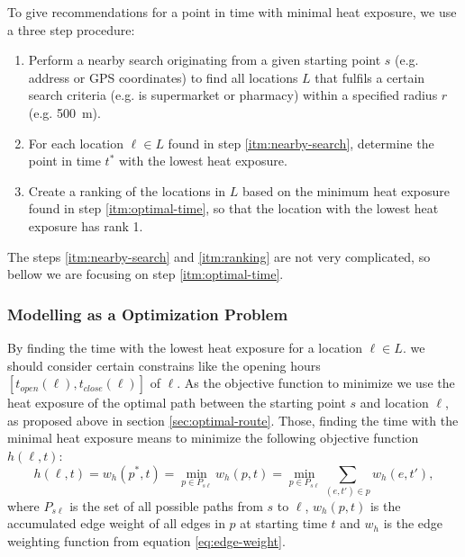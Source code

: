  To give recommendations for a point in time with minimal heat exposure, we use a three step procedure: 
 
 \begin{enumerate}
 	\item \label{itm:nearby-search} Perform a nearby search originating from a given starting point $s$  (e.g. address or GPS coordinates) to find all locations $L$ that fulfils a certain search criteria (e.g. is supermarket or pharmacy)  within a specified radius $r$ (e.g. \SI{500}{\meter}).
 	
 	\item \label{itm:optimal-time} For each location $\ell \in L$ found in step \ref{itm:nearby-search}, determine the point in time $t^*$ with the lowest heat exposure. 
 	
 	\item \label{itm:ranking} Create a ranking of the locations in $L$ based on the minimum heat exposure found in step \ref{itm:optimal-time}, so that the location with the lowest heat exposure has rank 1.
 \end{enumerate} 

The steps \ref{itm:nearby-search} and \ref{itm:ranking} are not very complicated, so bellow we are focusing on step \ref{itm:optimal-time}. 

\subsubsection{Modelling as a Optimization Problem} 

By finding the time with the lowest heat exposure for a location $\ell \in L$. we should consider certain constrains like the opening hours $[t_{open}(\ell),t_{close}(\ell)]$ of $\ell$. As the objective function to minimize we use the heat exposure of the optimal path between the starting point $s$ and location $\ell$, as proposed above in section \ref{sec:optimal-route}. Those, finding the time with the minimal heat exposure means to minimize the following objective function $h(\ell, t)$:
	\begin{equation}\label{eq:objective-funtion}
		h(\ell, t) = w_h(p^*, t) = \min_{p\in P_{s\ell}} w_h(p, t) = \min_{p\in P_{s\ell}} \sum_{(e, t') \in p} w_h(e, t'),
	\end{equation}
where $P_{s\ell}$ is the set of all possible paths from $s$ to $\ell$,  $w_h(p, t)$ is the accumulated edge weight of all edges in $p$ at starting time $t$ and $w_h$ is the edge weighting function from equation \eqref{eq:edge-weight}. 

